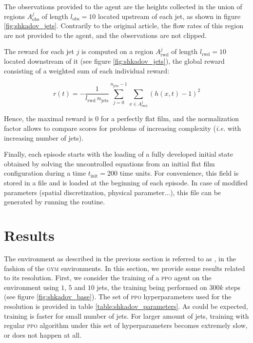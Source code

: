 The observations provided to the agent are the heights collected in the union of regions $A^j_\text{obs}$ of length $l_\text{obs} = 10$ located upstream of each jet, as shown in figure \ref{fig:shkadov_jets}. Contrarily to the original article, the flow rates of this region are not provided to the agent, and the observations are not clipped.

The reward for each jet $j$ is computed on a region $A^j_\text{rwd}$ of length $l_\text{rwd} = 10$ located downstream of it (see figure \ref{fig:shkadov_jets}), the global reward consisting of a weighted sum of each individual reward:

\begin{equation}
\label{eq:shkadov_reward}
	r(t) = - \frac{1}{l_\text{rwd} \, n_\text{jets}} \sum_{j=0}^{n_\text{jets}-1} \sum_{x \in A^j_\text{rwd}} (h(x,t) - 1)^2
\end{equation}

Hence, the maximal reward is $0$ for a perfectly flat film, and the normalization factor allows to compare scores for problems of increasing complexity (\textit{i.e.} with increasing number of jets).

Finally, each episode starts with the loading of a fully developed initial state obtained by solving the uncontrolled equations from an initial flat film configuration during a time $t_\text{init} = 200$ time units. For convenience, this field is stored in a file and is loaded at the beginning of each episode. In case of modified parameters (spatial discretization, physical parameter...), this file can be generated by running the  routine.

\section{Results}

The environment as described in the previous section is referred to as , in the fashion of the \textsc{gym} environments. In this section, we provide some results related to its resolution. First, we consider the training of a \textsc{ppo} agent on the environment using $1$, $5$ and $10$ jets, the training being performed on $300k$ steps (see figure \ref{fig:shkadov_base}). The set of \textsc{ppo} hyperparameters used for the resolution is provided in table \ref{table:shkadov_parameters}. As could be expected, training is faster for small number of jets. For larger amount of jets, training with regular \textsc{ppo} algorithm under this set of hyperparameters becomes extremely slow, or does not happen at all.

